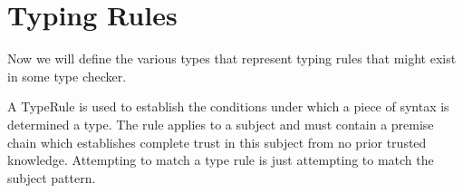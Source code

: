 \section{Typing Rules}

Now we will define the various types that represent typing rules that
might exist in some type checker.

A TypeRule is used to establish the conditions under which a piece
of syntax is determined a type. The rule applies to a subject and
must contain a premise chain which establishes complete trust in
this subject from no prior trusted knowledge. Attempting to match
a type rule is just attempting to match the subject pattern.

